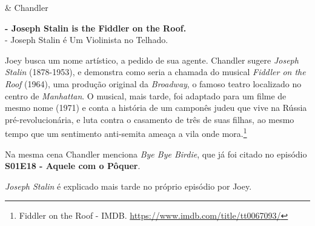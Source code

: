 \begin{tcolorbox}[enhanced,center upper,
    drop fuzzy shadow southeast, boxrule=0.3pt,
    lower separated=false, breakable,
    colframe=black!30!dialogoBorder,colback=white]
\begin{minipage}[c]{0.16\linewidth}
   & \centering \scriptsize{Chandler}
\end{minipage}
\hfill
\begin{minipage}[c]{0.8\linewidth}
  \textbf{- Joseph Stalin is the Fiddler on the Roof.}\\
  - Joseph Stalin é Um Violinista no Telhado.
\end{minipage}
\end{tcolorbox}

Joey busca um nome artístico, a pedido de sua agente. Chandler sugere
\emph{Joseph Stalin} (1878-1953), e demonstra como seria a chamada do
musical \emph{Fiddler on the Roof} (1964), uma produção original da
\emph{Broadway}, o famoso teatro localizado no centro de
\emph{Manhattan}. O musical, mais tarde, foi adaptado para um filme de
mesmo nome (1971) e conta a história de um camponês judeu que vive na
Rússia pré-revolucionária, e luta contra o casamento de três de suas
filhas, ao mesmo tempo que um sentimento anti-semita ameaça a vila onde
mora.\footnote{\sloppy Fiddler on the Roof - IMDB. \url{https://www.imdb.com/title/tt0067093/}}

Na mesma cena Chandler menciona \emph{Bye Bye Birdie}, que já foi citado
no episódio
\textbf{\textcolor{primarycolor}{S01E18 - Aquele com o Pôquer}}.

\emph{Joseph Stalin} é explicado mais tarde no próprio episódio por
Joey.

